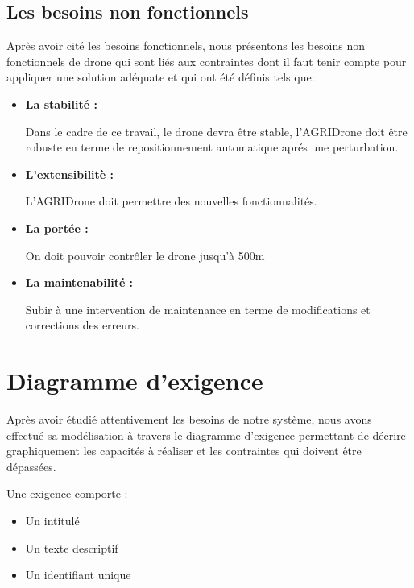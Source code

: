 \subsection{Les besoins non fonctionnels}
Après avoir cité les besoins fonctionnels, nous présentons
les besoins non fonctionnels de drone qui sont liés aux contraintes dont il faut tenir compte pour appliquer une solution adéquate et qui ont été définis tels que:
\begin{itemize}
	\item \textbf{La stabilité :}
	
	
	Dans le cadre de ce travail, le drone devra être stable, l'AGRIDrone doit être robuste en terme de repositionnement automatique aprés une perturbation.	
	
	\item \textbf{L'extensibilitè : }
	
	
	L'AGRIDrone doit permettre des nouvelles fonctionnalités.
	
	\item \textbf{La portée : } 
	
	
	On doit pouvoir contrôler le drone jusqu'à 500m
	
	
	\item \textbf{La maintenabilité : }  
	
	Subir à une intervention de maintenance en terme de modifications et corrections des erreurs.
	\end {itemize}
	\section{Diagramme d'exigence }
	Après avoir étudié attentivement les besoins de  notre système, nous avons effectué sa modélisation à travers le diagramme d'exigence permettant de décrire graphiquement les capacités à réaliser et les contraintes qui doivent être dépassées.
	
	Une exigence comporte : 
	\begin{itemize}
		\item Un intitulé 
		
		\item Un texte descriptif 
		
		\item Un identifiant unique
	\end{itemize}
	
